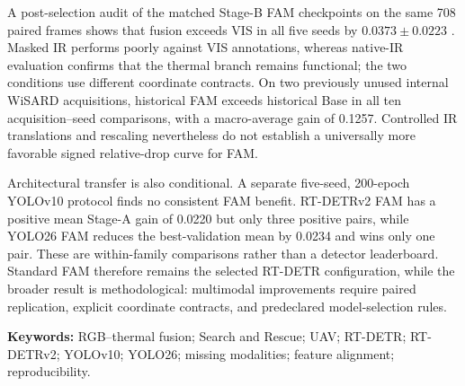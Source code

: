 A post-selection audit of the matched Stage-B FAM checkpoints on the same 708
paired frames shows that fusion exceeds VIS in all five seeds by
\(0.0373\pm0.0223\) \mapfifty{}. Masked IR performs poorly against VIS
annotations, whereas native-IR evaluation confirms that the thermal branch
remains functional; the two conditions use different coordinate contracts.
On two previously unused internal WiSARD acquisitions, historical FAM exceeds
historical Base in all ten acquisition--seed comparisons, with a macro-average
gain of 0.1257. Controlled IR translations and rescaling nevertheless do not
establish a universally more favorable signed relative-drop curve for FAM.

Architectural transfer is also conditional. A separate five-seed, 200-epoch
YOLOv10 protocol finds no consistent FAM benefit. RT-DETRv2 FAM has a positive
mean Stage-A gain of 0.0220 but only three positive pairs, while YOLO26 FAM
reduces the best-validation mean by 0.0234 and wins only one pair. These are
within-family comparisons rather than a detector leaderboard. Standard FAM
therefore remains the selected RT-DETR configuration, while the broader result
is methodological: multimodal improvements require paired replication,
explicit coordinate contracts, and predeclared model-selection rules.

\vspace{1em}
\noindent\textbf{Keywords:} RGB--thermal fusion; Search and Rescue; UAV;
RT-DETR; RT-DETRv2; YOLOv10; YOLO26; missing modalities; feature alignment;
reproducibility.
